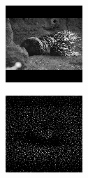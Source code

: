\begin{figure}[H]
  \setcounter{subfigure}{0}
  \begin{subfigure}[t]{0.13\textwidth}
    \centering
    \includegraphics[width=\linewidth]{img/one-trial/stimulus_3.png}
  \end{subfigure}
  \begin{subfigure}[t]{0.13\textwidth}
    \centering
    \includegraphics[width=\linewidth]{img/one-trial/intermediate-cnnv3/intermediate_2.png}

\end{subfigure}
\end{figure}

